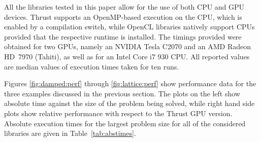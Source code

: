 \documentclass[final]{siamltex}
\begin{document}
%

All the libraries tested in this paper allow for the use of both CPU and
GPU devices.  Thrust supports an OpenMP-based execution on the CPU, which is enabled
by a compilation switch, while OpenCL libraries natively support CPUs provided that the respective runtime is installed.
The timings provided were obtained for two GPUs, namely an NVIDIA Tesla C2070 and
an AMD Radeon HD~7970 (Tahiti), as well as for an Intel Core i7 930 CPU.
All reported values are median values of execution times taken for ten runs.



Figures \ref{fig:damped:perf} through \ref{fig:lattice:perf} show performance
data for the three examples discussed in the previous section.
The plots on the left show absolute time against the size of the problem being solved, while right hand side plots   %
show relative performance with respect to the Thrust GPU version.
Absolute execution times for the largest
problem size for all of the considered libraries are given in Table~\ref{tab:abstimes}.

\end{document}
